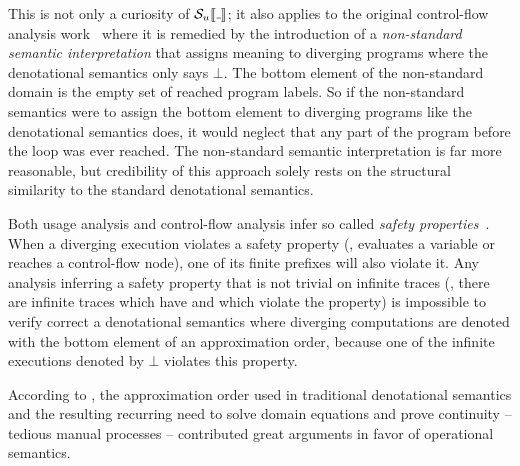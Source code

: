 This is not only a curiosity of $\semusg{\wild}$; it also applies to the original
control-flow analysis work~\citep[p. 23]{Shivers:91} where it is remedied
by the introduction of a \emph{non-standard semantic interpretation} that
assigns meaning to diverging programs where the denotational semantics only
says $\bot$.
The bottom element of the non-standard domain is the empty set of reached
program labels. So if the non-standard semantics were to assign the bottom
element to diverging programs like the denotational semantics does, it would
neglect that any part of the program before the loop was ever reached.
The non-standard semantic interpretation is far more reasonable, but credibility
of this approach solely rests on the structural similarity to the standard
denotational semantics.

Both usage analysis and control-flow analysis infer so called
\emph{safety properties}~\citep{Lamport:77,Cousot:21}.
When a diverging execution violates a safety property (\eg, evaluates a variable
or reaches a control-flow node), one of its finite prefixes will also violate
it.
Any analysis inferring a safety property that is not trivial on infinite traces
(\eg, there are infinite traces which have and which violate the property)
is impossible to verify correct \wrt a denotational semantics where diverging
computations are denoted with the bottom element of an approximation order,
because one of the infinite executions denoted by $\bot$ violates this property.

According to \citet[Section 2.3]{WrightFelleisen:94}, the approximation order
used in traditional denotational semantics and the resulting recurring need
to solve domain equations and prove continuity -- tedious manual processes --
contributed great arguments in favor of operational semantics.


